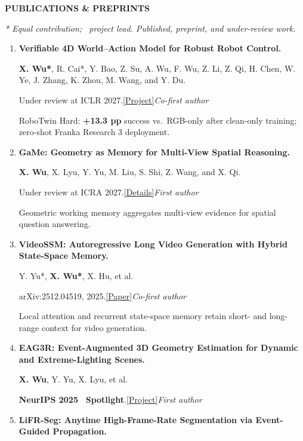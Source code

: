 \documentclass[a4paper]{article}
\newcommand{\cvsection}[1]{%
  \par\vspace{3.8pt}%
  {\color{cvblue}\fontsize{11}{12.2}\selectfont\bfseries\MakeUppercase{#1}}\par
  \vspace{-4pt}{\color{cvblue}\rule{\textwidth}{0.4pt}}\par\vspace{1.4pt}%
}
\newcommand{\pubgroup}[1]{%
  \par\vspace{3.8pt}{\color{cvblue}\fontsize{9.4}{10.4}\selectfont\bfseries #1}\par
}
\newcommand{\pubnote}[1]{\par{\color{cvgray}#1}}
\begin{document}
\cvsection{Publications \& Preprints}
{\fontsize{9}{9.65}\selectfont
\textit{* Equal contribution; \textdagger\ project lead. Published, preprint, and under-review work.}\par
\pubgroup{First- and Co-first-author Work}
\begin{enumerate}[leftmargin=1.6em,labelsep=0.38em,itemsep=1.5pt,topsep=1.3pt,parsep=0pt,partopsep=0pt]
\item \textbf{Verifiable 4D World--Action Model for Robust Robot Control.}\par
\textbf{X. Wu*}, R. Cai*, Y. Bao, Z. Su, A. Wu, F. Wu, Z. Li, Z. Qi, H. Chen, W. Ye, J. Zhang, K. Zhou, M. Wang, and Y. Du.\par
Under review at ICLR 2027.\quad\href{https://demo1-indol-gamma.vercel.app/}{\textcolor{cvblue}{[Project]}}\hfill\textcolor{cvblue}{\textit{Co-first author}}
\pubnote{RoboTwin Hard: \textbf{+13.3 pp} success vs.\ RGB-only after clean-only training; zero-shot Franka Research 3 deployment.}
\item \textbf{GaMe: Geometry as Memory for Multi-View Spatial Reasoning.}\par
\textbf{X. Wu}, X. Lyu, Y. Yu, M. Liu, S. Shi, Z. Wang, and X. Qi.\par
Under review at ICRA 2027.\quad\href{https://candy-crusher.github.io/xiaoshanwu.github.io/publications.html#pub-game}{\textcolor{cvblue}{[Details]}}\hfill\textcolor{cvblue}{\textit{First author}}
\pubnote{Geometric working memory aggregates multi-view evidence for spatial question answering.}
\item \textbf{VideoSSM: Autoregressive Long Video Generation with Hybrid State-Space Memory.}\par
Y. Yu*, \textbf{X. Wu*}, X. Hu, et al.\par
arXiv:2512.04519, 2025.\quad\href{https://arxiv.org/abs/2512.04519}{\textcolor{cvblue}{[Paper]}}\hfill\textcolor{cvblue}{\textit{Co-first author}}
\pubnote{Local attention and recurrent state-space memory retain short- and long-range context for video generation.}
\item \textbf{EAG3R: Event-Augmented 3D Geometry Estimation for Dynamic and Extreme-Lighting Scenes.}\par
\textbf{X. Wu}, Y. Yu, X. Lyu, et al.\par
\textbf{NeurIPS 2025} \textcolor{cvred}{\textbf{\textperiodcentered\ Spotlight}}.\quad\href{https://candy-crusher.github.io/EAG3R_Proj/}{\textcolor{cvblue}{[Project]}}\hfill\textcolor{cvblue}{\textit{First author}}
\item \textbf{LiFR-Seg: Anytime High-Frame-Rate Segmentation via Event-Guided Propagation.}\par

\end{enumerate}}
\end{document}

